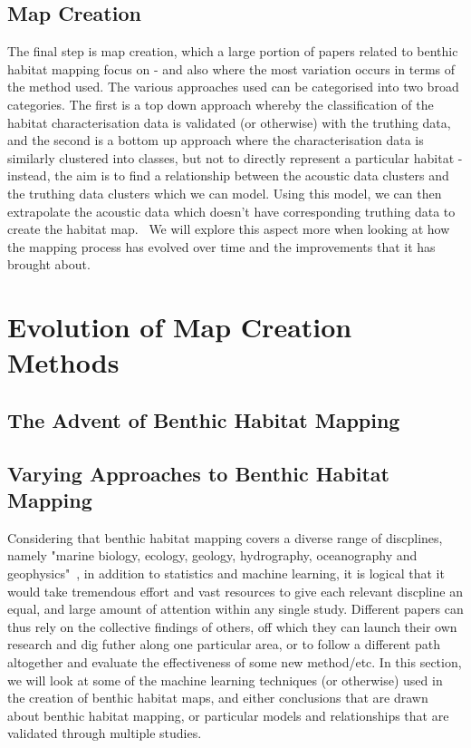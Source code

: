 \documentclass[12pt]{article}
\begin{document}
            \subsection{Map Creation}
            The final step is map creation, which a large portion of papers related to benthic habitat mapping focus on - and also where the most variation occurs in terms of the method used. The various approaches used can be categorised into two broad categories. The first is a top down approach whereby the classification of the habitat characterisation data is validated (or otherwise) with the truthing data, and the second is a bottom up approach where the characterisation data is similarly clustered into classes, but not to directly represent a particular habitat - instead, the aim is to find a relationship between the acoustic data clusters and the truthing data clusters which we can model. Using this model, we can then extrapolate the acoustic data which doesn't have corresponding truthing data to create the habitat map.~\citep*{ahsan11} We will explore this aspect more when looking at how the mapping process has evolved over time and the improvements that it has brought about.

            \section{Evolution of Map Creation Methods}

            \subsection{The Advent of Benthic Habitat Mapping}

            \subsection{Varying Approaches to Benthic Habitat Mapping}
            Considering that benthic habitat mapping covers a diverse range of discplines, namely "marine biology, ecology, geology, hydrography, oceanography and geophysics"~\citep{cjbrown11}, in addition to statistics and machine learning, it is logical that it would take tremendous effort and vast resources to give each relevant discpline an equal, and large amount of attention within any single study. Different papers can thus rely on the collective findings of others, off which they can launch their own research and dig futher along one particular area, or to follow a different path altogether and evaluate the effectiveness of some new method/etc. In this section, we will look at some of the machine learning techniques (or otherwise) used in the creation of benthic habitat maps, and either conclusions that are drawn about benthic habitat mapping, or particular models and relationships that are validated through multiple studies.
\end{document}

